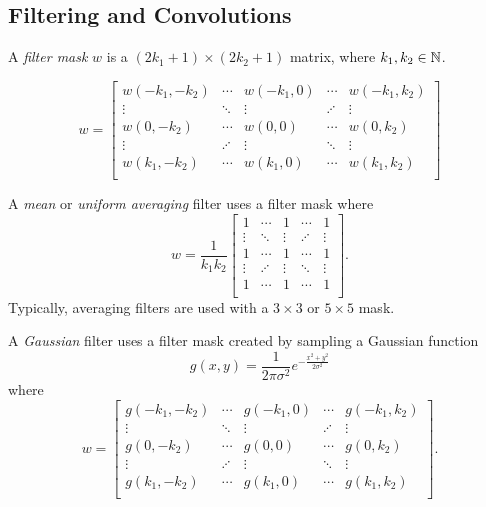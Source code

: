 \subsection{Filtering and Convolutions}

\begin{defn}
    A \emph{filter mask} $w$ is a $(2k_1 + 1) \times (2k_2 + 1)$ matrix, where $k_1, k_2 \in \mathbb{N}$.

    \[w = \begin{bmatrix}
        w{(-k_1, -k_2)} & \cdots & w{(-k_1, 0)} & \cdots & w{(-k_1, k_2)} \\
        \vdots & \ddots & \vdots & \iddots & \vdots \\
        w{(0, -k_2)} & \cdots & w{(0, 0)} & \cdots & w{(0, k_2)} \\
        \vdots & \iddots & \vdots & \ddots & \vdots \\
        w{(k_1, -k_2)} & \cdots & w{(k_1, 0)} & \cdots & w{(k_1, k_2)} \\
    \end{bmatrix}\]
\end{defn}

\begin{exmp}
    A \emph{mean} or \emph{uniform averaging} filter uses a filter mask where
    \[w = \frac{1}{k_1k_2}\begin{bmatrix}
        1 & \cdots & 1 & \cdots & 1 \\
        \vdots & \ddots & \vdots & \iddots & \vdots \\
        1 & \cdots & 1 & \cdots & 1 \\
        \vdots & \iddots & \vdots & \ddots & \vdots \\
        1 & \cdots & 1 & \cdots & 1 \\
    \end{bmatrix}.\] Typically, averaging filters are used with a $3 \times 3$ or $5 \times 5$ mask.
\end{exmp}

\begin{exmp}
    A \emph{Gaussian} filter uses a filter mask created by sampling a Gaussian function \[g(x, y) = \frac{1}{2\pi\sigma^2}e^{-\frac{x^2+y^2}{2\sigma^2}}\] where
    \[w = \begin{bmatrix}
        g(-k_1, -k_2) & \cdots & g(-k_1, 0) & \cdots & g(-k_1, k_2) \\
        \vdots & \ddots & \vdots & \iddots & \vdots \\
        g(0, -k_2) & \cdots & g(0, 0) & \cdots & g(0, k_2) \\
        \vdots & \iddots & \vdots & \ddots & \vdots \\
        g(k_1, -k_2) & \cdots & g(k_1, 0) & \cdots & g(k_1, k_2) \\
    \end{bmatrix}.\]
\end{exmp}

